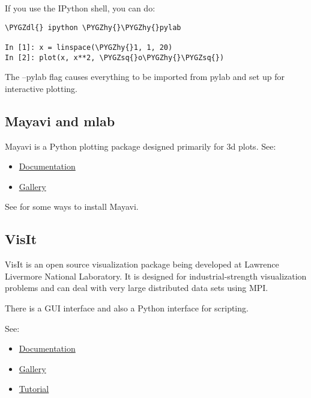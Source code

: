 \documentclass[letterpaper,10pt,english]{sphinxmanual}
\def\PYGZdl{\char`\$}
\def\PYGZhy{\char`\-}
\def\PYGZsq{\char`\'}
\renewcommand\PYGZsq{\textquotesingle}
\begin{document}
If you use the IPython shell, you can do:

\begin{Verbatim}[commandchars=\\\{\}]
\PYGZdl{} ipython \PYGZhy{}\PYGZhy{}pylab

In [1]: x = linspace(\PYGZhy{}1, 1, 20)
In [2]: plot(x, x**2, \PYGZsq{}o\PYGZhy{}\PYGZsq{})
\end{Verbatim}

The --pylab flag causes everything to be imported from pylab and set up for
interactive plotting.


\subsection{Mayavi and mlab}
\label{python_plotting:mayavi}\label{python_plotting:mayavi-and-mlab}
Mayavi is a Python plotting package designed primarily for 3d plots.  See:
\begin{itemize}
\item {} 
\href{http://code.enthought.com/projects/mayavi/docs/development/html/mayavi/index.html}{Documentation}

\item {} 
\href{http://code.enthought.com/projects/mayavi/docs/development/html/mayavi/auto/examples.html}{Gallery}

\end{itemize}

See {\hyperref[software_installation:software\string-installation]{}} for some ways to install Mayavi.


\subsection{VisIt}
\label{python_plotting:visit}\label{python_plotting:id1}
VisIt is an open source visualization package being developed at Lawrence Livermore
National Laboratory.  It is designed for industrial-strength visualization problems
and can deal with very large distributed data sets using MPI.

There is a GUI interface and also a Python interface for scripting.

See:
\begin{itemize}
\item {} 
\href{https://wci.llnl.gov/codes/visit/doc.html}{Documentation}

\item {} 
\href{https://wci.llnl.gov/codes/visit/gallery.html}{Gallery}

\item {} 
\href{http://www.visitusers.org/index.php?title=Short\_Tutorial}{Tutorial}

\end{itemize}
\end{document}

